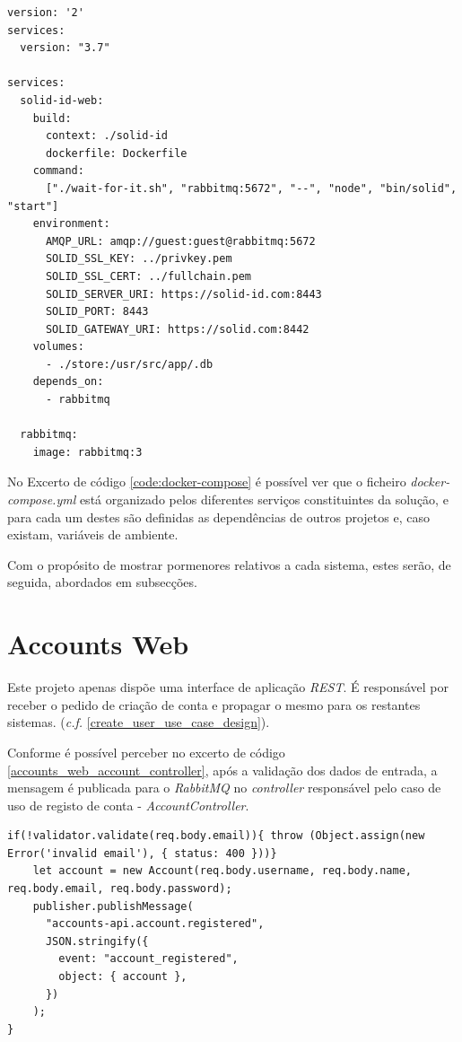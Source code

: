 \begin{lstlisting}[language=docker-compose-2,caption={Ficheiro \emph{docker-compose.yml}},breaklines=true,label={code:docker-compose}]
version: '2'
services:
  version: "3.7"

services:
  solid-id-web:
    build:
      context: ./solid-id
      dockerfile: Dockerfile
    command:
      ["./wait-for-it.sh", "rabbitmq:5672", "--", "node", "bin/solid", "start"]
    environment:
      AMQP_URL: amqp://guest:guest@rabbitmq:5672
      SOLID_SSL_KEY: ../privkey.pem
      SOLID_SSL_CERT: ../fullchain.pem
      SOLID_SERVER_URI: https://solid-id.com:8443
      SOLID_PORT: 8443
      SOLID_GATEWAY_URI: https://solid.com:8442
    volumes:
      - ./store:/usr/src/app/.db
    depends_on:
      - rabbitmq

  rabbitmq:
    image: rabbitmq:3

\end{lstlisting}

No Excerto de código \ref{code:docker-compose} é possível ver que o ficheiro \emph{docker-compose.yml} está organizado pelos diferentes serviços constituintes da solução, e para cada um destes são definidas as dependências de outros projetos e, caso existam, variáveis de ambiente.

Com o propósito de mostrar pormenores relativos a cada sistema, estes serão, de seguida, abordados em subsecções.

\section{Accounts Web}
Este projeto apenas dispõe uma interface de aplicação \emph{\acrshort{REST}}. É responsável por receber o pedido de criação de conta e propagar o mesmo para os restantes sistemas. (\emph{c.f.} \ref{create_user_use_case_design}).

Conforme é possível perceber no excerto de código \ref{accounts_web_account_controller}, após a validação dos dados de entrada, a mensagem é publicada para o \emph{RabbitMQ} no \emph{controller} responsável pelo caso de uso de registo de conta - \emph{AccountController}.

\begin{lstlisting}[caption={\emph{AccountController} responsável por validar e propagar informação do utilizador}, label={accounts_web_account_controller}]
if(!validator.validate(req.body.email)){ throw (Object.assign(new Error('invalid email'), { status: 400 }))}
    let account = new Account(req.body.username, req.body.name, req.body.email, req.body.password);
    publisher.publishMessage(
      "accounts-api.account.registered",
      JSON.stringify({
        event: "account_registered",
        object: { account },
      })
    );
}
\end{lstlisting}

